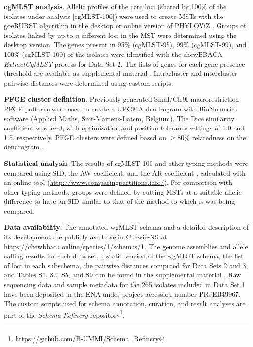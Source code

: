 \textbf{cgMLST analysis}. Allelic profiles of the core loci (shared by 100\% of the isolates under analysis [cgMLST-100]) were used to create \ac{MST}s with the goeBURST algorithm in the desktop or online version of PHYLOViZ \cite{nascimento_phyloviz_2017, ribeiro-goncalves_phyloviz_2016}. Groups of isolates linked by up to \textit{n} different loci in the \ac{MST} were determined using the desktop version. The genes present in 95\% (cgMLST-95), 99\% (cgMLST-99), and 100\% (cgMLST-100) of the isolates were identified with the chewBBACA \textit{ExtractCgMLST} process for Data Set 2. The lists of genes for each gene presence threshold are available as supplemental material \cite{friaes_supplemental_2023}. Intracluster and intercluster pairwise distances were determined using custom scripts.

\textbf{PFGE cluster definition}. Previously generated SmaI/Cfr9I macrorestriction \ac{PFGE} patterns \cite{friaes_superantigen_2013, friaes_group_2012, blackwell_exploring_2021} were used to create a \ac{UPGMA} dendrogram with BioNumerics software (Applied Maths, Sint-Martens-Latem, Belgium). The Dice similarity coefﬁcient was used, with optimization and position tolerance settings of 1.0 and 1.5, respectively. \ac{PFGE} clusters were defined based on $\geq80\%$ relatedness on the dendrogram \cite{carrico_illustration_2006}.

\textbf{Statistical analysis}. The results of cgMLST-100 and other typing methods were compared using \ac{SID}, the \ac{AW} coefficient, and the \ac{AR} coefficient \cite{carrico_illustration_2006, severiano_adjusted_2011}, calculated with an online tool (\url{http://www.comparingpartitions.info/}). For comparison with other typing methods, groups were defined by cutting \ac{MST}s at a suitable allelic difference to have an \ac{SID} similar to that of the method to which it was being compared.

\textbf{Data availability}. The annotated \ac{wgMLST} schema and a detailed description of its development are publicly available in \ac{Chewie-NS} \cite{mamede_chewie_2021} at \url{https://chewbbaca.online/species/1/schemas/1}. The genome assemblies and allele calling results for each data set, a static version of the \ac{wgMLST} schema, the list of loci in each subschema, the pairwise distances computed for Data Sets 2 and 3, and Tables S1, S2, S5, and S9 can be found in the supplemental material \cite{friaes_supplemental_2023}. Raw sequencing data and sample metadata for the 265 isolates included in Data Set 1 have been deposited in the \ac{ENA} under project accession number PRJEB49967. The custom scripts used for schema annotation, curation, and result analyses are part of the \textit{Schema Refinery} repository\footnote{\url{https://github.com/B-UMMI/Schema_Refinery}}.

